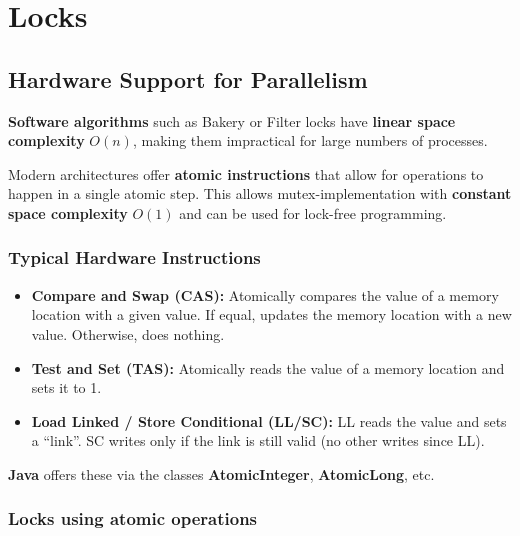 \section{Locks}

\subsection{Hardware Support for Parallelism}

\begin{remark}
\textbf{Software algorithms} such as Bakery or Filter locks have \textbf{linear space complexity} $O(n)$, making them impractical for large numbers of processes.
\end{remark}

\begin{remark}
Modern architectures offer \textbf{atomic instructions} that allow for operations to happen in a single atomic step. This allows mutex-implementation with \textbf{constant space complexity} $O(1)$ and can be used for lock-free programming.
\end{remark}

\subsubsection{Typical Hardware Instructions}

\begin{definition}
    \begin{itemize}
        \item \textbf{Compare and Swap (CAS):} Atomically compares the value of a memory location with a given value. If equal, updates the memory location with a new value. Otherwise, does nothing.
        \item \textbf{Test and Set (TAS):} Atomically reads the value of a memory location and sets it to 1.
        \item \textbf{Load Linked / Store Conditional (LL/SC):} LL reads the value and sets a ``link''. SC writes only if the link is still valid (no other writes since LL).
    \end{itemize}
\end{definition}

\begin{remark}
\textbf{Java} offers these via the classes \textbf{AtomicInteger}, \textbf{AtomicLong}, etc.
\end{remark}

\subsubsection{Locks using atomic operations}

